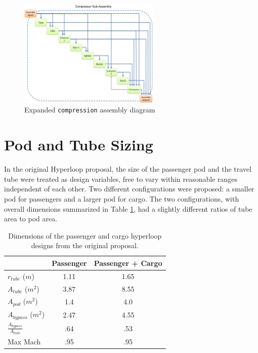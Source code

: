 \documentclass[heading.tex]{subfiles}
\begin{document}
\begin{figure}[H]
\centering
\includegraphics[width=0.6\textwidth]{images/compAssembly.png}
\caption{Expanded \texttt{compression} assembly diagram}
\label{f:compressorXDSM}
\end{figure}


\section{Pod and Tube Sizing}
\label{s:sizing}

In the original Hyperloop proposal, the size of the passenger pod and the travel tube were treated as design variables, 
free to vary within reasonable ranges independent of each other. Two different configurations were proposed: a smaller 
pod for passengers and a larger pod for cargo. The two configurations, with overall dimensions summarized 
in Table \ref{t:hyperbase}, had a slightly different ratios of tube area to pod area. 

\begin{table}
  \centering
  \caption{Dimensions of the passenger and cargo hyperloop designs from the original proposal. }
  \label{t:hyperbase}
  \begin{tabular}{l c c}
    \hline
                                  &  Passenger       & Passenger + Cargo \\ \hline
    $r_{tube}$ ($m$)              &        1.11      &     1.65  \\
    $A_{tube}$  ($m^2$)           &        3.87      &     8.55  \\
    $A_{pod}$ ($m^2$)             &        1.4       &     4.0   \\ 
    $A_{bypass}$ ($m^2$)          &        2.47      &     4.55  \\ 
    $\frac{A_{bypass}}{A_{tube}}$ &        .64       &     .53   \\
    Max Mach                      &        .95       &     .95   \\
    \hline
  \end{tabular}
\end{table}
\end{document}
